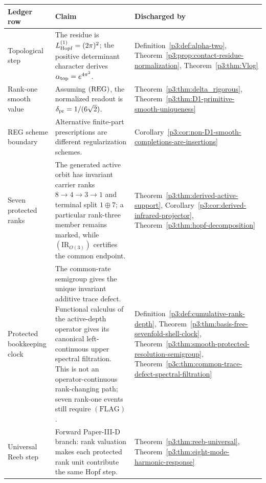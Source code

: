 \documentclass[12pt,a4paper]{article}
\begin{document}
\begin{table}[H]
\centering
\small
\begingroup
\setlength{\tabcolsep}{3pt}
\renewcommand{\arraystretch}{1.15}
\begin{tabular}{@{}
  L{3.0cm}
  L{7.2cm}
  L{\dimexpr\linewidth-10.2cm-4\tabcolsep\relax}
@{}}
\toprule
\textbf{Ledger row}
& \textbf{Claim}
& \textbf{Discharged by} \\
\midrule
Topological step
& The residue is \(L_{\mathrm{Hopf}}^{(1)}=(2\pi)^2\); the positive determinant character derives \(\alpha_{\rm top}=e^{4\pi^2}\).
& Definition~\ref{p3:def:alpha-two}, Theorem~\ref{p3:prop:contact-residue-normalization}, Theorem~\ref{p3:thm:Vlog} \\

Rank-one smooth value
& Assuming \(({\rm REG})\), the normalized readout is \(\delta_{\rm pr}=1/(6\sqrt2)\).
& Theorem~\ref{p3:thm:delta_rigorous}, Theorem~\ref{p3:thm:D1-primitive-smooth-uniqueness} \\

REG scheme boundary
& Alternative finite-part prescriptions are different regularization schemes.
& Corollary~\ref{p3:cor:non-D1-smooth-completions-are-insertions} \\

Seven protected ranks
& The generated active orbit has invariant carrier ranks \(8\to4\to3\to1\)
and terminal split \(1\oplus7\); a particular rank-three member remains marked,
while \((\mathrm{IR}_{O(3)})\) certifies the common endpoint.
& Theorem~\ref{p3:thm:derived-active-support}, Corollary~\ref{p3:cor:derived-infrared-projector}, Theorem~\ref{p3:thm:hopf-decomposition} \\

Protected bookkeeping clock
& The common-rate semigroup gives the unique invariant additive trace defect.
Functional calculus of the active-depth operator gives its canonical
left-continuous upper spectral filtration.  This is not an
operator-continuous rank-changing path; seven rank-one events still require
\((\mathrm{FLAG})\).
& Definition~\ref{p3:def:cumulative-rank-depth}, Theorem~\ref{p3:thm:basis-free-sevenfold-shell-clock}, Theorem~\ref{p3:thm:smooth-protected-resolution-semigroup}, Theorem~\ref{p3c:thm:common-trace-defect-spectral-filtration} \\

Universal Reeb step
& Forward Paper-III-D branch: rank valuation makes each protected rank unit contribute the same Hopf step.
& Theorem~\ref{p3:thm:reeb-universal}, Theorem~\ref{p3:thm:eight-mode-harmonic-response} \\


\end{tabular}
\end{table}
\end{document}
